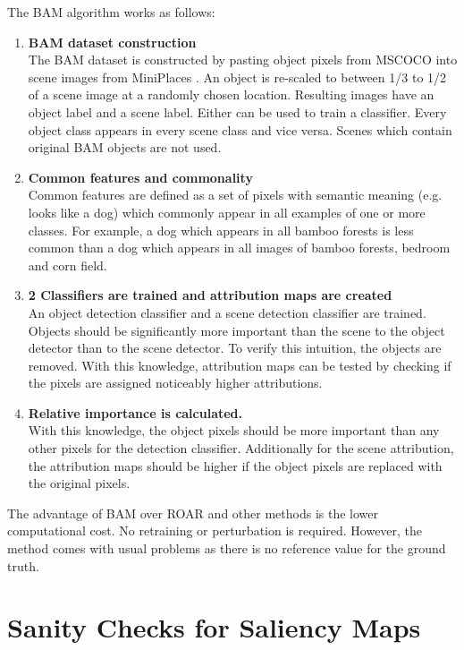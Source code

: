 The BAM algorithm works as follows:
\begin{enumerate}
	\item \textbf{BAM dataset construction}\\
	The BAM dataset is constructed by pasting object pixels from MSCOCO \cite{lin2015microsoft} into scene images from MiniPlaces \cite{zhou2016places}. An object is re-scaled to between 1/3 to 1/2 of a scene image at a randomly chosen location. Resulting images have an object label and a scene label. Either can be used to train a classifier. Every object class appears in every scene class and vice versa. Scenes which contain original BAM objects are not used.
	\item \textbf{Common features and commonality}\\
	Common features are defined as a set of pixels with semantic meaning (e.g. looks like a dog) which commonly appear in all examples of one or more classes. For example, a dog which appears in all bamboo forests is less common than a dog  which appears in all images of bamboo forests, bedroom and corn field.
	\item \textbf{2 Classifiers are trained and attribution maps are created}\\
	An object detection classifier and a scene detection classifier are trained. Objects should be significantly more important than the scene to the object detector  than to the scene detector. To verify this intuition, the objects are removed. With this knowledge, attribution maps can be tested by checking if the pixels are assigned noticeably higher attributions.
	\item \textbf{Relative importance is calculated.}\\
	With this knowledge, the object pixels should be more important than any other pixels for the detection classifier. Additionally for the scene attribution, the attribution maps should be higher if the object pixels are replaced with the original pixels.
\end{enumerate}


The advantage of BAM over ROAR \cite{hooker2019benchmark} and other methods is the lower computational cost. No retraining or perturbation is required. However, the method comes with usual problems as there is no reference value for the ground truth.


\section{Sanity Checks for Saliency Maps \cite{adebayo2020sanity}}

